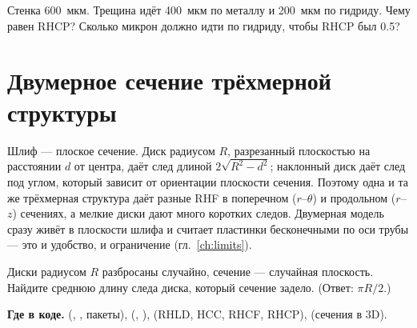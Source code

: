 \begin{exercise}
Стенка 600~мкм. Трещина идёт 400~мкм по металлу и 200~мкм по гидриду. Чему равен RHCP?
Сколько микрон должно идти по гидриду, чтобы RHCP был 0.5?
\end{exercise}

\section{Двумерное сечение трёхмерной структуры}

Шлиф --- плоское сечение. Диск радиусом $R$, разрезанный плоскостью на расстоянии $d$ от центра,
даёт след длиной $2\sqrt{R^2-d^2}$; наклонный диск даёт след под углом, который зависит от
ориентации плоскости сечения. Поэтому одна и та же трёхмерная структура даёт разные RHF в
поперечном ($r$--$\theta$) и продольном ($r$--$z$) сечениях, а мелкие диски дают много коротких
следов. Двумерная модель сразу живёт в плоскости шлифа и считает пластинки бесконечными по оси
трубы --- это и удобство, и ограничение (гл.~\ref{ch:limits}).

\begin{exercise}
Диски радиусом $R$ разбросаны случайно, сечение --- случайная плоскость. Найдите среднюю длину
следа диска, который сечение задело. (Ответ: $\pi R/2$.)
\end{exercise}

\begin{codebox}
\textbf{Где в коде.}  (, , пакеты),
 (, ),  (RHLD, HCC,
RHCF, RHCP),  (сечения в 3D).
\end{codebox}

